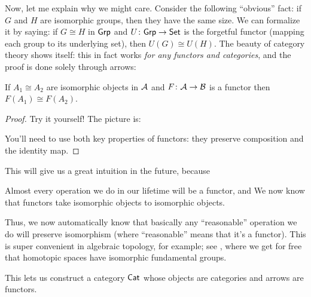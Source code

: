 Now, let me explain why we might care.
Consider the following ``obvious'' fact:
if $G$ and $H$ are isomorphic groups, then they have the same size.
We can formalize it by saying: if $G \cong H$ in $\catname{Grp}$
and $U \colon \catname{Grp} \to \catname{Set}$ is the forgetful functor
(mapping each group to its underlying set), then $U(G) \cong U(H)$.
The beauty of category theory shows itself:
this in fact works \emph{for any functors and categories},
and the proof is done solely through arrows:

\begin{theorem}
	\label{thm:functor_isom}
	If $A_1 \cong A_2$ are isomorphic objects in $\AA$
	and $F \colon \AA \to \BB$ is a functor
	then $F(A_1) \cong F(A_2)$.
\end{theorem}
\begin{proof}
	Try it yourself! The picture is:
	\begin{center}
	\end{center}
	You'll need to use both key properties of functors:
	they preserve composition and the identity map.
\end{proof}

This will give us a great intuition in the future, because
\begin{enumerate}[(i)]
	\ii Almost every operation we do in our lifetime will be a functor, and
	\ii We now know that functors take isomorphic objects to isomorphic objects.
\end{enumerate}
Thus, we now automatically know that basically any ``reasonable'' operation
we do will preserve isomorphism (where ``reasonable'' means that it's a functor).
This is super convenient in algebraic topology, for example;
see , where we get for free that homotopic
spaces have isomorphic fundamental groups.

\begin{remark}
	This lets us construct a category $\catname{Cat}$
	whose objects are categories and arrows are functors.
\end{remark}

